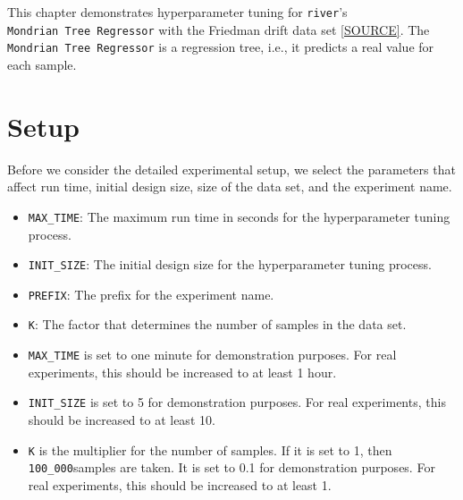 \documentclass[
  letterpaper,
  DIV=11,
  numbers=noendperiod]{scrreprt}
\providecommand{\tightlist}{%
  \setlength{\itemsep}{0pt}\setlength{\parskip}{0pt}}\usepackage{longtable,booktabs,array}
\begin{document}
This chapter demonstrates hyperparameter tuning for \texttt{river}'s
\texttt{Mondrian\ Tree\ Regressor} with the Friedman drift data set
\href{https://riverml.xyz/0.18.0/api/datasets/synth/FriedmanDrift/}{{[}SOURCE{]}}.
The \texttt{Mondrian\ Tree\ Regressor} is a regression tree, i.e., it
predicts a real value for each sample.

\hypertarget{sec-setup-51}{%
\section{Setup}\label{sec-setup-51}}

Before we consider the detailed experimental setup, we select the
parameters that affect run time, initial design size, size of the data
set, and the experiment name.

\begin{itemize}
\tightlist
\item
  \texttt{MAX\_TIME}: The maximum run time in seconds for the
  hyperparameter tuning process.
\item
  \texttt{INIT\_SIZE}: The initial design size for the hyperparameter
  tuning process.
\item
  \texttt{PREFIX}: The prefix for the experiment name.
\item
  \texttt{K}: The factor that determines the number of samples in the
  data set.
\end{itemize}

\begin{tcolorbox}[enhanced jigsaw, rightrule=.15mm, opacityback=0, colframe=quarto-callout-caution-color-frame, opacitybacktitle=0.6, toptitle=1mm, arc=.35mm, colbacktitle=quarto-callout-caution-color!10!white, coltitle=black, toprule=.15mm, leftrule=.75mm, titlerule=0mm, title=\textcolor{quarto-callout-caution-color}{\faFire}\hspace{0.5em}{Caution: Run time and initial design size should be increased for real
experiments}, bottomrule=.15mm, breakable, bottomtitle=1mm, left=2mm, colback=white]

\begin{itemize}
\tightlist
\item
  \texttt{MAX\_TIME} is set to one minute for demonstration purposes.
  For real experiments, this should be increased to at least 1 hour.
\item
  \texttt{INIT\_SIZE} is set to 5 for demonstration purposes. For real
  experiments, this should be increased to at least 10.
\item
  \texttt{K} is the multiplier for the number of samples. If it is set
  to 1, then \texttt{100\_000}samples are taken. It is set to 0.1 for
  demonstration purposes. For real experiments, this should be increased
  to at least 1.
\end{itemize}

\end{tcolorbox}
\end{document}
